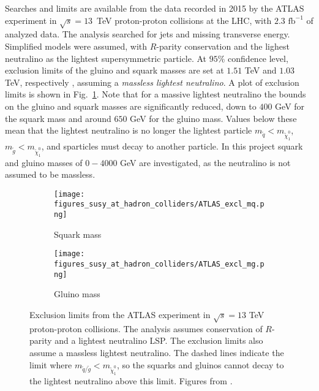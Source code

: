 \documentclass[twoside,english]{uiofysmaster}
\begin{document}
{Searches and limits are available from the data recorded in 2015 by the ATLAS experiment in $\sqrt{s}=13$~TeV proton-proton collisions at the LHC, with $2.3 \text{ fb}^{-1}$ of analyzed data. The analysis searched for jets and missing transverse energy. Simplified models were assumed, with $R$-parity conservation and the lighest neutralino as the lightest supersymmetric particle. At $95 \%$ confidence level, exclusion limits of the gluino and squark masses are set at $1.51$ TeV and $1.03$ TeV, respectively \cite{aaboud2016search}, assuming a \textit{massless lightest neutralino}. A plot of exclusion limits is shown in Fig.\ \ref{Fig:: susy hadron : ATLAS exclusion limits}. Note that for a massive lightest neutralino the bounds on the gluino and squark masses are significantly reduced, down to $400$ GeV for the squark mass and around $650$ GeV for the gluino mass. Values below these mean that the lightest neutralino is no longer the lightest particle $m_{\widetilde{q}} < m_{\widetilde{\chi}^0_1}$, $m_{\widetilde{g}} < m_{\widetilde{\chi}^0_1}$, and sparticles must decay to another particle. In this project squark and gluino masses of $0-4000$ GeV are investigated, as the neutralino is not assumed to be massless.

\begin{figure}[H]
    \centering
    \begin{subfigure}[b]{0.8\textwidth}
        \texttt{[image: figures\_susy\_at\_hadron\_colliders/ATLAS\_excl\_mq.png]}
        \caption{Squark mass}
    \end{subfigure}
    \begin{subfigure}[b]{0.8\textwidth}
        \texttt{[image: figures\_susy\_at\_hadron\_colliders/ATLAS\_excl\_mg.png]}
        \caption{Gluino mass}
    \end{subfigure}
    \caption{Exclusion limits from the ATLAS experiment in $\sqrt{s} = 13$ TeV proton-proton collisions. The analysis assumes conservation of $R$-parity and a lightest neutralino LSP. The exclusion limits also assume a massless lightest neutralino. The dashed lines indicate the limit where $m_{\widetilde{q}/\widetilde{g}} < m_{\widetilde{\chi}^0_1}$, so the squarks and gluinos cannot decay to the lightest neutralino above this limit. Figures from \cite{aaboud2016search}.}\label{Fig:: susy hadron : ATLAS exclusion limits}
\end{figure}


}
\end{document}
